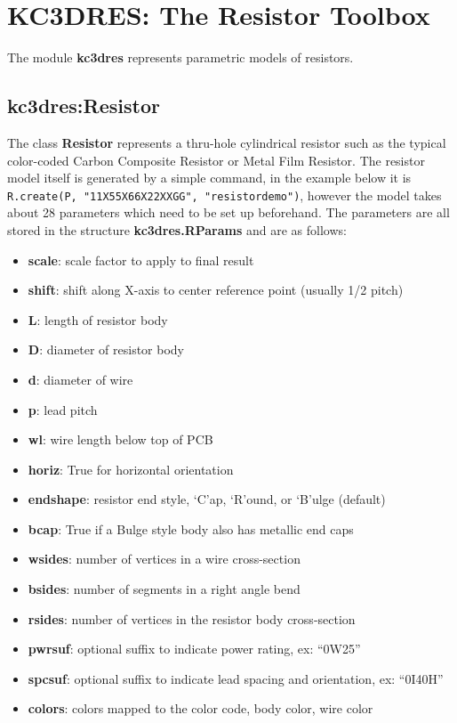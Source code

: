 \documentclass[a4paper, dvipdfm]{article}
\begin{document}
\section{KC3DRES: The Resistor Toolbox}
The module \textbf{kc3dres} represents parametric models of resistors. 

\subsection{kc3dres:Resistor}
The class \textbf{Resistor} represents a thru-hole cylindrical resistor such as
the typical color-coded Carbon Composite Resistor or Metal Film Resistor. The
resistor model itself is generated by a simple command, in the example below it is
\verb#R.create(P, "11X55X66X22XXGG", "resistordemo")#, however the model takes
about 28 parameters which need to be set up beforehand.  The parameters are all
stored in the structure \textbf{kc3dres.RParams} and are as follows:

\begin{itemize}
\item\textbf{scale}: scale factor to apply to final result
\item\textbf{shift}: shift along X-axis to center reference point (usually 1/2 pitch)
\item\textbf{L}: length of resistor body
\item\textbf{D}: diameter of resistor body
\item\textbf{d}: diameter of wire
\item\textbf{p}: lead pitch
\item\textbf{wl}: wire length below top of PCB
\item\textbf{horiz}: True for horizontal orientation
\item\textbf{endshape}: resistor end style, `C'ap, `R'ound, or `B'ulge (default)
\item\textbf{bcap}: True if a Bulge style body also has metallic end caps
\item\textbf{wsides}: number of vertices in a wire cross-section
\item\textbf{bsides}: number of segments in a right angle bend
\item\textbf{rsides}: number of vertices in the resistor body cross-section
\item\textbf{pwrsuf}: optional suffix to indicate power rating, ex: ``0W25''
\item\textbf{spcsuf}: optional suffix to indicate lead spacing and orientation, ex: ``0I40H''
\item\textbf{colors}: colors mapped to the color code, body color, wire color
\end{itemize}
\end{document}
